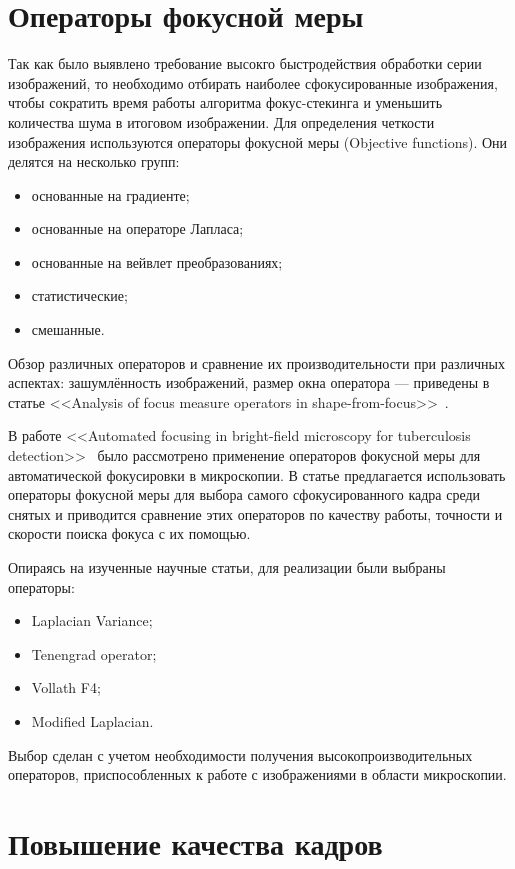 \documentclass[14pt]{matmex-diploma-custom}
\begin{document}
\section{Операторы фокусной меры}
Так как было выявлено требование высокго быстродействия обработки серии изображений, то необходимо отбирать наиболее сфокусированные изображения, чтобы сократить время работы алгоритма фокус-стекинга и уменьшить количества шума в итоговом изображении. Для определения четкости изображения используются операторы фокусной меры (Objective functions). Они делятся на несколько групп:
\begin{itemize}
    \item основанные на градиенте;
    \item основанные на операторе Лапласа;
    \item основанные на вейвлет преобразованиях;
    \item статистические;
    \item смешанные.
\end{itemize}

Обзор различных операторов и сравнение их производительности при различных аспектах: зашумлённость изображений, размер окна оператора --- приведены в статье <<Analysis of focus measure operators in shape-from-focus>>~\cite{MeasureOperators}.

В работе <<Automated focusing in bright-field microscopy for tuberculosis detection>>~\cite{BestOperators} было рассмотрено применение операторов фокусной меры для автоматической фокусировки в микроскопии. В статье предлагается использовать операторы фокусной меры для выбора самого сфокусированного кадра среди снятых и приводится сравнение этих операторов по качеству работы, точности и скорости поиска фокуса с их помощью.

Опираясь на изученные научные статьи, для реализации были выбраны операторы:
\begin{itemize}
    \item Laplacian Variance; 
    \item Tenengrad operator;
    \item Vollath F4;
    \item Modified Laplacian.
\end{itemize}
Выбор сделан с учетом необходимости получения высокопроизводительных операторов, приспособленных к работе с изображениями в области микроскопии.

\section{Повышение качества кадров}
\end{document}
